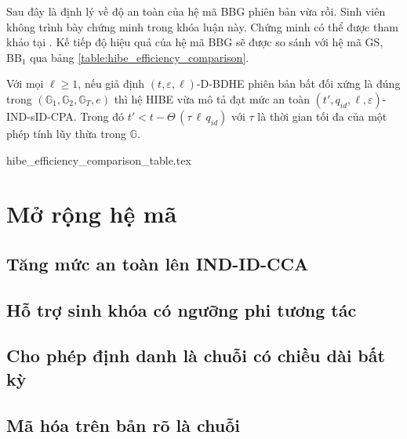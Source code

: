 \documentclass[class=report, crop=false]{standalone}
\begin{document}
		Sau đây là định lý về độ an toàn của hệ mã BBG phiên bản vừa rồi. Sinh viên không trình bày chứng minh trong khóa luận này. Chứng minh có thể được tham khảo tại \cite{DBLP:conf/eurocrypt/BonehBG05}. Kế tiếp độ hiệu quả của hệ mã BBG sẽ được so sánh với hệ mã GS, BB$_1$ qua bảng \ref{table:hibe_efficiency_comparison}.
		\begin{theorem}
			Với mọi $\ell \geq 1$, nếu giả định $(t, \varepsilon, \ell)$-D-BDHE phiên bản bất đối xứng là đúng trong $(\mathbb{G}_1, \mathbb{G}_2, \mathbb{G}_T, e)$ thì hệ HIBE vừa mô tả đạt mức an toàn $(t', q_{id}, \ell, \varepsilon)$-IND-sID-CPA. Trong đó $t' < t - \Theta\,(\tau\, \ell\, q_{id})$ với $\tau$ là thời gian tối đa của một phép tính lũy thừa trong $\mathbb{G}$.
		\end{theorem}
		\newpage
		{hibe_efficiency_comparison_table.tex}
	\section{Mở rộng hệ mã}
		\subsection{Tăng mức an toàn lên IND-ID-CCA}
			
		\subsection{Hỗ trợ sinh khóa có ngưỡng phi tương tác}
		\subsection{Cho phép định danh là chuỗi có chiều dài bất kỳ}
		\subsection{Mã hóa trên bản rõ là chuỗi}


	\newpage
\end{document}
